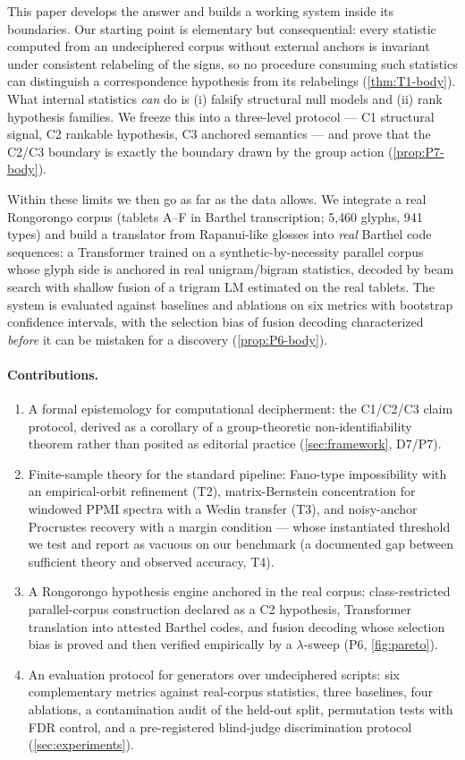 \documentclass[10pt,twocolumn]{article}
\newcommand{\Cone}{\textsf{C1}}
\newcommand{\Ctwo}{\textsf{C2}}
\newcommand{\Cthree}{\textsf{C3}}
\begin{document}
This paper develops the answer and builds a working system inside its
boundaries. Our starting point is elementary but consequential: every
statistic computed from an undeciphered corpus without external anchors
is invariant under consistent relabeling of the signs, so no procedure
consuming such statistics can distinguish a correspondence hypothesis
from its relabelings (\cref{thm:T1-body}). What internal statistics
\emph{can} do is (i) falsify structural null models and (ii) rank
hypothesis families. We freeze this into a three-level protocol ---
\Cone{} structural signal, \Ctwo{} rankable hypothesis, \Cthree{}
anchored semantics --- and prove that the \Ctwo/\Cthree{} boundary is
exactly the boundary drawn by the group action
(\cref{prop:P7-body}).

Within these limits we then go as far as the data allows. We integrate a
real Rongorongo corpus (tablets A--F in Barthel transcription;
5{,}460 glyphs, 941 types) and build a translator from Rapanui-like
glosses into \emph{real} Barthel code sequences: a Transformer trained
on a synthetic-by-necessity parallel corpus whose glyph side is anchored
in real unigram/bigram statistics, decoded by beam search with shallow
fusion of a trigram LM estimated on the real tablets. The system is
evaluated against baselines and ablations on six metrics with bootstrap
confidence intervals, with the selection bias of fusion decoding
characterized \emph{before} it can be mistaken for a discovery
(\cref{prop:P6-body}).

\paragraph{Contributions.}
\begin{enumerate}[nosep,leftmargin=1.2em]
\item A formal epistemology for computational decipherment: the
\Cone/\Ctwo/\Cthree{} claim protocol, derived as a corollary of a
group-theoretic non-identifiability theorem rather than posited as
editorial practice (\cref{sec:framework}, D7/P7).
\item Finite-sample theory for the standard pipeline: Fano-type
impossibility with an empirical-orbit refinement (T2), matrix-Bernstein
concentration for windowed PPMI spectra with a Wedin transfer (T3), and
noisy-anchor Procrustes recovery with a margin condition --- whose
instantiated threshold we test and report as vacuous on our benchmark
(a documented gap between sufficient theory and observed accuracy, T4).
\item A Rongorongo hypothesis engine anchored in the real corpus:
class-restricted parallel-corpus construction declared as a \Ctwo{}
hypothesis, Transformer translation into attested Barthel codes, and
fusion decoding whose selection bias is proved and then verified
empirically by a $\lambda$-sweep (P6, \cref{fig:pareto}).
\item An evaluation protocol for generators over undeciphered scripts:
six complementary metrics against real-corpus statistics, three
baselines, four ablations, a contamination audit of the held-out split,
permutation tests with FDR control, and a pre-registered blind-judge
discrimination protocol (\cref{sec:experiments}).
\end{enumerate}
\end{document}
